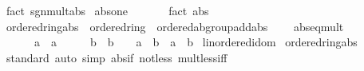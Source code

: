 \begin{isabellebody}
\ {\isacharparenleft}{\kern0pt}fact\ sgn{\isacharunderscore}{\kern0pt}mult{\isacharunderscore}{\kern0pt}abs{\isacharparenright}{\kern0pt}%
\endisatagproof
{\isafoldproof}%
%
\isadelimproof
\isanewline
%
\endisadelimproof
\isanewline
{}\isamarkupfalse%
\ abs{\isacharunderscore}{\kern0pt}one{\isacharcolon}{\kern0pt}\ {\isachardoublequoteopen}{\isasymbar}{}{\isasymbar}\ {\isacharequal}{\kern0pt}\ {}{\isachardoublequoteclose}\isanewline
%
\isadelimproof
\ \ %
\endisadelimproof
%
\isatagproof
{}\isamarkupfalse%
\ {\isacharparenleft}{\kern0pt}fact\ abs{\isacharunderscore}{\kern0pt}{}{\isacharparenright}{\kern0pt}%
\endisatagproof
{\isafoldproof}%
%
\isadelimproof
\isanewline
%
\endisadelimproof
\isanewline
{}\isamarkupfalse%
\isanewline
\isanewline
{}\isamarkupfalse%
\ ordered{\isacharunderscore}{\kern0pt}ring{\isacharunderscore}{\kern0pt}abs\ {\isacharequal}{\kern0pt}\ ordered{\isacharunderscore}{\kern0pt}ring\ {\isacharplus}{\kern0pt}\ ordered{\isacharunderscore}{\kern0pt}ab{\isacharunderscore}{\kern0pt}group{\isacharunderscore}{\kern0pt}add{\isacharunderscore}{\kern0pt}abs\ {\isacharplus}{\kern0pt}\isanewline
\ \ \ abs{\isacharunderscore}{\kern0pt}eq{\isacharunderscore}{\kern0pt}mult{\isacharcolon}{\kern0pt}\isanewline
\ \ \ \ {\isachardoublequoteopen}{\isacharparenleft}{\kern0pt}{}\ {\isasymle}\ a\ {\isasymor}\ a\ {\isasymle}\ {}{\isacharparenright}{\kern0pt}\ {\isasymand}\ {\isacharparenleft}{\kern0pt}{}\ {\isasymle}\ b\ {\isasymor}\ b\ {\isasymle}\ {}{\isacharparenright}{\kern0pt}\ {\isasymLongrightarrow}\ {\isasymbar}a\ {\isacharasterisk}{\kern0pt}\ b{\isasymbar}\ {\isacharequal}{\kern0pt}\ {\isasymbar}a{\isasymbar}\ {\isacharasterisk}{\kern0pt}\ {\isasymbar}b{\isasymbar}{\isachardoublequoteclose}\isanewline
\isanewline
{}\isamarkupfalse%
\ linordered{\isacharunderscore}{\kern0pt}idom\isanewline
{}\isanewline
\isanewline
{}\isamarkupfalse%
\ ordered{\isacharunderscore}{\kern0pt}ring{\isacharunderscore}{\kern0pt}abs\isanewline
%
\isadelimproof
\ \ %
\endisadelimproof
%
\isatagproof
{}\isamarkupfalse%
\ standard\ {\isacharparenleft}{\kern0pt}auto\ simp{\isacharcolon}{\kern0pt}\ abs{\isacharunderscore}{\kern0pt}if\ not{\isacharunderscore}{\kern0pt}less\ mult{\isacharunderscore}{\kern0pt}less{\isacharunderscore}{\kern0pt}{}{\isacharunderscore}{\kern0pt}iff{\isacharparenright}{\kern0pt}%
\endisatagproof
{\isafoldproof}%
%

\end{isabellebody}
